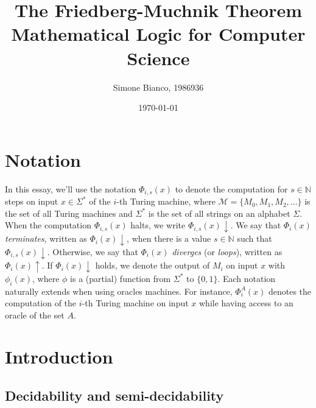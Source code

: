 \documentclass[12pt,a4paper]{article}
\theoremstyle{definition}
\newcommand{\N}{\mathbb{N}}                     %
\begin{document}
    \setlength{\parskip}{5pt}               %
    \setlength{\parindent}{0pt}             %

    \title{The Friedberg-Muchnik Theorem\\[0.2em]\smaller{}Mathematical Logic for Computer Science}
    \author{Simone Bianco, 1986936}
    \date{\today}
    
    \maketitle

    \hypersetup{linkcolor=black}
    \setlength{\parskip}{0pt}
    \tableofcontents
    \hypersetup{linkcolor=red}
    \setlength{\parskip}{5pt}

    \newpage

    \section*{Notation}

    In this essay, we'll use the notation $\Phi_{i,s}(x)$ to denote the computation for $s \in \N$ steps on input $x \in \Sigma^*$ of the $i$-th Turing machine, where $\mathcal{M} = \{M_0, M_1, M_2, \ldots\}$ is the set of all Turing machines and $\Sigma^*$ is the set of all strings on an alphabet $\Sigma$. When the computation $\Phi_{i,s}(x)$ halts, we write $\Phi_{i,s}(x) \downarrow$. We say that $\Phi_i(x)$ \textit{terminates}, written as $\Phi_i(x) \downarrow$, when there is a value $s \in \N$ such that $\Phi_{i,s}(x) \downarrow$. Otherwise, we say that $\Phi_i(x)$ \textit{diverges} (or \textit{loops}), written as $\Phi_i(x) \uparrow$.
    If $\Phi_i(x) \downarrow$ holds, we denote the output of $M_i$ on input $x$ with $\phi_i(x)$, where $\phi$ is a (partial) function from $\Sigma^*$ to $\{0,1\}$. 
    Each notation naturally extends when using oracles machines. For instance, $\Phi_i^A(x)$ denotes the computation of the $i$-th Turing machine on input $x$ while having access to an oracle of the set $A$.


    \section{Introduction}

    \subsection{Decidability and semi-decidability}
\end{document}
